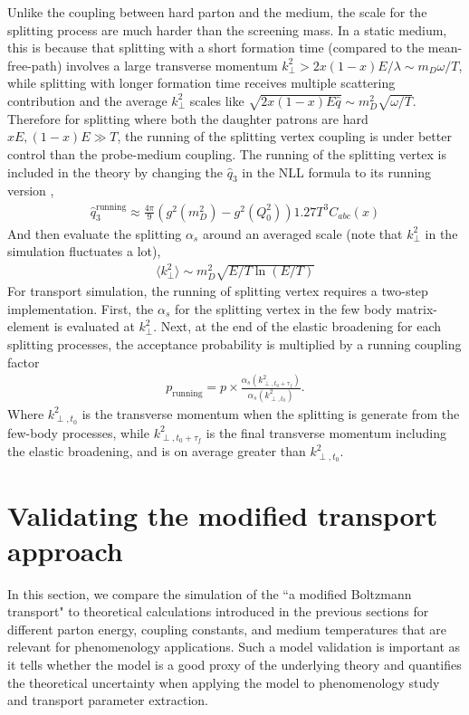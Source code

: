 Unlike the coupling between hard parton and the medium, the scale for the splitting process are much harder than the screening mass.
In a static medium, this is because that splitting with a short formation time (compared to the mean-free-path) involves a large transverse momentum $k_\perp^2 > 2x(1-x)E /\lambda \sim m_D \omega/T$, while splitting with longer formation time receives multiple scattering contribution and the average $k_\perp^2$ scales like $\sqrt{2x(1-x)E\hat{q}} \sim m_D^2 \sqrt{\omega/T}$.
Therefore for splitting where both the daughter patrons are hard $xE, (1-x)E \gg T$, the running of the splitting vertex coupling is under better control than the probe-medium coupling.
The running of the splitting vertex is included in the theory by changing the $\hat{q}_3$ in the NLL formula to its running version  \cite{Arnold:2008zu},
\begin{eqnarray}
\hat{q}_3^{\textrm{running}} \approx \frac{4\pi}{9}\left(g^2(m_D^2) - g^2(Q_0^2)\right) 1.27 T^3 C_{abc}(x)
\label{eq:q3running}
\end{eqnarray}
And then evaluate the splitting $\alpha_s$ around an averaged scale (note that $k_\perp^2$ in the simulation fluctuates a lot),
\begin{eqnarray}
\langle k_\perp^2\rangle \sim m_D^2 \sqrt{E/T\ln(E/T)}
\label{eq:runscale}
\end{eqnarray}  
For transport simulation, the running of splitting vertex requires a two-step implementation. 
First, the $\alpha_s$ for the splitting vertex in the few body matrix-element is evaluated at $k_\perp^2$.
Next, at the end of the elastic broadening for each splitting processes, the acceptance probability is multiplied by a running coupling factor
\begin{eqnarray}
p_{\textrm{running}} = p\times \frac{\alpha_s(k_{\perp,t_0+\tau_f}^2)}{\alpha_s(k_{\perp,t_0}^2)}.
\end{eqnarray}
Where $k_{\perp,t_0}^2$ is the transverse momentum when the splitting is generate from the few-body processes, while $k_{\perp,t_0+\tau_f}^2$ is the final transverse momentum including the elastic broadening, and is on average greater than $k_{\perp,t_0}^2$.

\section{Validating the modified transport approach}
In this section, we compare the simulation of the ``a modified Boltzmann transport" to theoretical calculations introduced in the previous sections for different parton energy, coupling constants, and medium temperatures that are relevant for phenomenology applications.
Such a model validation is important as it tells whether the model is a good proxy of the underlying theory and quantifies the theoretical uncertainty when applying the model to phenomenology study and transport parameter extraction.

